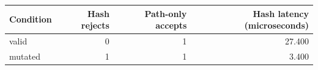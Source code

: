 \begin{tabular}{lrrr}\toprule
Condition & Hash rejects & Path-only accepts & Hash latency (microseconds)\\\midrule
valid & 0 & 1 & 27.400\\
mutated & 1 & 1 & 3.400\\\bottomrule
\end{tabular}
